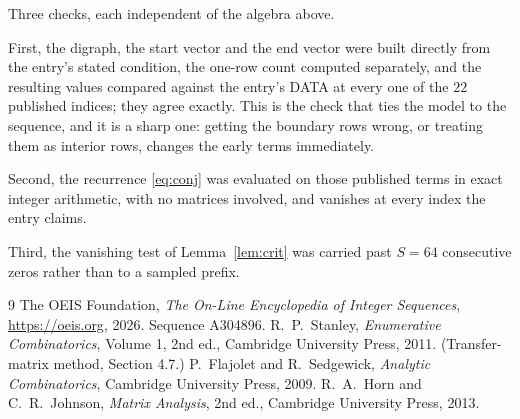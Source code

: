 \documentclass[11pt,a4paper]{article}
\theoremstyle{plain}
\theoremstyle{definition}
\begin{document}
Three checks, each independent of the algebra above.

First, the digraph, the start vector and the end vector were built directly from the
entry's stated condition, the one-row count computed separately, and the resulting values
compared against the entry's DATA at every one of the $22$ published indices; they
agree exactly. This is the check that ties the model to the sequence, and it is a sharp one:
getting the boundary rows wrong, or treating them as interior rows, changes the early terms
immediately.

Second, the recurrence \eqref{eq:conj} was evaluated on those published terms in exact
integer arithmetic, with no matrices involved, and vanishes at every index the entry claims.

Third, the vanishing test of Lemma~\ref{lem:crit} was carried past $S=64$ consecutive
zeros rather than to a sampled prefix.

\begin{thebibliography}{9}
 The OEIS Foundation, \emph{The On-Line Encyclopedia of Integer
Sequences}, \url{https://oeis.org}, 2026. Sequence A304896.
 R.~P.~Stanley, \emph{Enumerative Combinatorics}, Volume 1, 2nd ed.,
Cambridge University Press, 2011. (Transfer-matrix method, Section 4.7.)
 P.~Flajolet and R.~Sedgewick, \emph{Analytic Combinatorics}, Cambridge
University Press, 2009.
 R.~A.~Horn and C.~R.~Johnson, \emph{Matrix Analysis}, 2nd ed., Cambridge
University Press, 2013.
\end{thebibliography}
\end{document}
